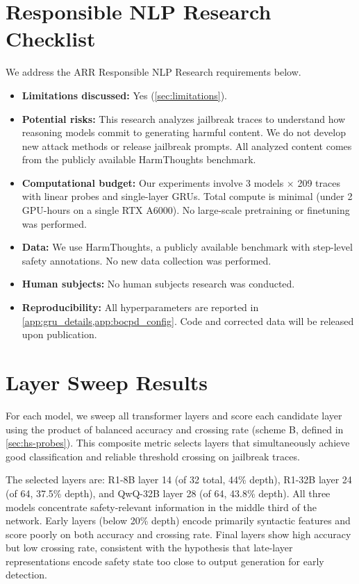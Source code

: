 \appendix

\section{Responsible NLP Research Checklist}
\label{app:checklist}

We address the ARR Responsible NLP Research requirements below.

\begin{itemize}
    \item \textbf{Limitations discussed:} Yes (\cref{sec:limitations}).
    \item \textbf{Potential risks:} This research analyzes jailbreak traces to understand how reasoning models commit to generating harmful content. We do not develop new attack methods or release jailbreak prompts. All analyzed content comes from the publicly available HarmThoughts benchmark.
    \item \textbf{Computational budget:} Our experiments involve 3 models $\times$ 209 traces with linear probes and single-layer GRUs. Total compute is minimal (under 2 GPU-hours on a single RTX A6000). No large-scale pretraining or finetuning was performed.
    \item \textbf{Data:} We use HarmThoughts, a publicly available benchmark with step-level safety annotations. No new data collection was performed.
    \item \textbf{Human subjects:} No human subjects research was conducted.
    \item \textbf{Reproducibility:} All hyperparameters are reported in \cref{app:gru_details,app:bocpd_config}. Code and corrected data will be released upon publication.
\end{itemize}


\section{Layer Sweep Results}
\label{app:layer_sweep}

For each model, we sweep all transformer layers and score each candidate layer using the product of balanced accuracy and crossing rate (scheme B, defined in \cref{sec:hs-probes}). This composite metric selects layers that simultaneously achieve good classification and reliable threshold crossing on jailbreak traces.

The selected layers are: R1-8B layer 14 (of 32 total, 44\% depth), R1-32B layer 24 (of 64, 37.5\% depth), and QwQ-32B layer 28 (of 64, 43.8\% depth). All three models concentrate safety-relevant information in the middle third of the network. Early layers (below 20\% depth) encode primarily syntactic features and score poorly on both accuracy and crossing rate. Final layers show high accuracy but low crossing rate, consistent with the hypothesis that late-layer representations encode safety state too close to output generation for early detection.

